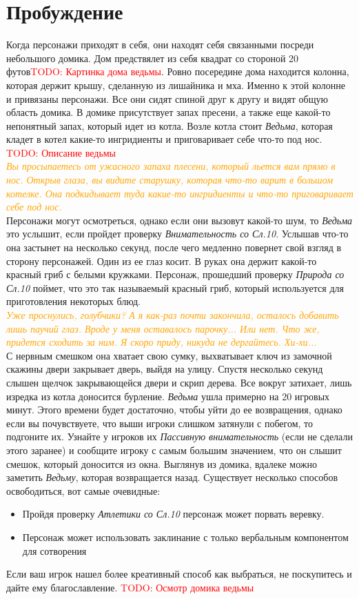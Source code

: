 \documentclass[10pt,a4paper]{book}
\newcommand{\TODO}[1]{\textcolor{red}{TODO: #1}}
\newcommand{\monster}[1]{\textit{#1}}
\newcommand{\dm}[1]{\\\textcolor{orange}{\textit{#1}}\\}
\renewcommand{\check}[2]{\textit{#1 со Сл.#2}}
\begin{document}
		\section{Пробуждение}
			Когда персонажи приходят в себя, они находят себя связанными посреди небольшого домика. Дом предствялет из себя квадрат со стороной 20 футов\TODO{Картинка дома ведьмы}. Ровно посередине дома находится колонна, которая держит крышу, сделанную из лишайника и мха. Именно к этой колонне и привязаны персонажи. Все они сидят спиной друг к другу и видят общую область домика. В домике присутствует запах пресени, а также еще какой-то непонятный запах, который идет из котла. Возле котла стоит \monster{Ведьма}, которая кладет в котел какие-то ингридиенты и приговаривает себе что-то под нос. \TODO{Описание ведьмы}
			\dm{Вы просыпаетесь от ужасного запаха плесени, который льется вам прямо в нос. Открыв глаза, вы видите старушку, которая что-то варит в большом котелке. Она подкидывает туда какие-то ингридиенты и что-то приговаривает себе под нос.}
			Персонажи могут осмотреться, однако если они вызовут какой-то шум, то \monster{Ведьма} это услышит, если пройдет проверку \check{Внимательность}{10}. Услышав что-то она застынет на несколько секунд, после чего медленно повернет свой взгляд в сторону персонажей. Один из ее глаз косит. В руках она держит какой-то красный гриб с белыми кружками. Персонаж, прошедший проверку \check{Природа}{10} поймет, что это так называемый красный гриб, который используется для приготовления некоторых блюд.
			\dm{Уже проснулись, голубчики? А я как-раз почти закончила, осталось добавить лишь паучий глаз. Вроде у меня оставалось парочку... Или нет. Что же, придется сходить за ним. Я скоро приду, никуда не дергайтесь. Хи-хи...}
			С нервным смешком она хватает свою сумку, выхватывает ключ из замочной скажины двери закрывает дверь, выйдя на улицу. Спустя несколько секунд слышен щелчок закрывающейся двери и скрип дерева. Все вокруг затихает, лишь изредка из котла доносится бурление.
			\monster{Ведьма} ушла примерно на 20 игровых минут. Этого времени будет достаточно, чтобы уйти до ее возвращения, однако если вы почувствуете, что выши игроки слишком затянули с побегом, то подгоните их. Узнайте у игроков их \textit{Пассивную внимательность} (если не сделали этого заранее) и сообщите игроку с самым большим значением, что он слышит смешок, который доносится из окна. Выглянув из домика, вдалеке можно заметить \monster{Ведьму}, которая возвращается назад.
			Существует несколько способов освободиться, вот самые очевидные:
			\begin{itemize}
				\item Пройдя проверку \check{Атлетики}{10} персонаж может порвать веревку.
				\item Персонаж может использовать заклинание с только вербальным компонентом для сотворения
			\end{itemize}
			Если ваш игрок нашел более креативный способ как выбраться, не поскупитесь и дайте ему благославление.
			\TODO{Осмотр домика ведьмы}
\end{document}
